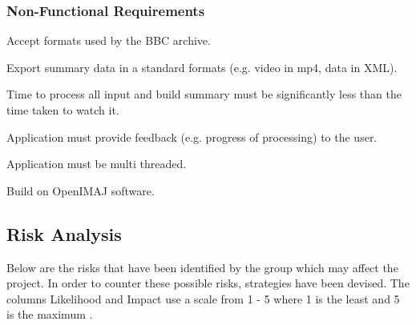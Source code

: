 	\subsubsection{Non-Functional Requirements}
		\begin{list}{     NF:~}{}
			\item{Accept formats used by the BBC archive.}
			\item{Export summary data in a standard formats (e.g. video in mp4, data in XML).}
			\item{Time to process all input and build summary must be significantly less than the time taken to watch it.}
			\item{Application must provide feedback (e.g. progress of processing) to the user.}
			\item{Application must be multi threaded.}
			\item{Build on OpenIMAJ software.}
		\end{list}

\subsection{Risk Analysis}
\label{sec:Risks}
Below are the risks that have been identified by the group which may affect the project. In order to counter these possible risks, strategies have been devised. The columns Likelihood and Impact use a scale from 1 - 5 where 1 is the least and 5 is the maximum \cite{riskRef}.

